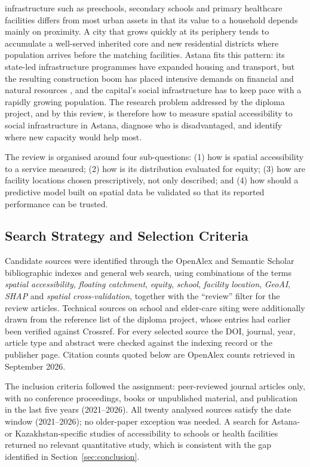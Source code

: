 \documentclass[journal]{IEEEtran}
\begin{document}
 infrastructure such as preschools, secondary schools and primary healthcare facilities differs from most urban assets in that its value to a household depends mainly on proximity. A city that grows quickly at its periphery tends to accumulate a well-served inherited core and new residential districts where population arrives before the matching facilities. Astana fits this pattern: its state-led infrastructure programmes have expanded housing and transport, but the resulting construction boom has placed intensive demands on financial and natural resources \cite{astana2025}, and the capital's social infrastructure has to keep pace with a rapidly growing population. The research problem addressed by the diploma project, and by this review, is therefore how to measure spatial accessibility to social infrastructure in Astana, diagnose who is disadvantaged, and identify where new capacity would help most.

The review is organised around four sub-questions: (1) how is spatial accessibility to a service measured; (2) how is its distribution evaluated for equity; (3) how are facility locations chosen prescriptively, not only described; and (4) how should a predictive model built on spatial data be validated so that its reported performance can be trusted.

\subsection{Search Strategy and Selection Criteria}
Candidate sources were identified through the OpenAlex and Semantic Scholar bibliographic indexes and general web search, using combinations of the terms \emph{spatial accessibility}, \emph{floating catchment}, \emph{equity}, \emph{school}, \emph{facility location}, \emph{GeoAI}, \emph{SHAP} and \emph{spatial cross-validation}, together with the ``review'' filter for the review articles. Technical sources on school and elder-care siting were additionally drawn from the reference list of the diploma project, whose entries had earlier been verified against Crossref. For every selected source the DOI, journal, year, article type and abstract were checked against the indexing record or the publisher page. Citation counts quoted below are OpenAlex counts retrieved in September 2026.

The inclusion criteria followed the assignment: peer-reviewed journal articles only, with no conference proceedings, books or unpublished material, and publication in the last five years (2021--2026). All twenty analysed sources satisfy the date window (2021--2026); no older-paper exception was needed. A search for Astana- or Kazakhstan-specific studies of accessibility to schools or health facilities returned no relevant quantitative study, which is consistent with the gap identified in Section~\ref{sec:conclusion}.
\end{document}
